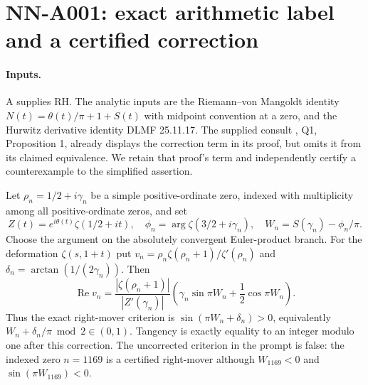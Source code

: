 \section{NN-A001: exact arithmetic label and a certified correction}
\label{sec:NN-A001}

\paragraph{Inputs.}
A supplies RH.  The analytic inputs are the Riemann--von Mangoldt identity
$N(t)=\theta(t)/\pi+1+S(t)$ with midpoint convention at a zero, and the
Hurwitz derivative identity DLMF 25.11.17.  The supplied consult
, Q1, Proposition 1, already
displays the correction term in its proof, but omits it from its claimed
equivalence.  We retain that proof's term and independently certify a
counterexample to the simplified assertion.

\begin{theorem}[NN-A001]
Let $\rho_n=1/2+i\gamma_n$ be a simple positive-ordinate zero, indexed with
multiplicity among all positive-ordinate zeros, and set
\[
 Z(t)=e^{i\theta(t)}\zeta(1/2+it),\quad
 \phi_n=\arg\zeta(3/2+i\gamma_n),\quad
 W_n=S(\gamma_n)-\phi_n/\pi.
\]
Choose the argument on the absolutely convergent Euler-product branch.
For the deformation $\zeta(s,1+t)$ put
$v_n=\rho_n\zeta(\rho_n+1)/\zeta'(\rho_n)$ and
$\delta_n=\arctan(1/(2\gamma_n))$.  Then
\[
 \operatorname{Re}v_n=
 \frac{|\zeta(\rho_n+1)|}{|Z'(\gamma_n)|}
 \left(\gamma_n\sin\pi W_n+\frac12\cos\pi W_n\right).       \tag{A001.1}
\]
Thus the exact right-mover criterion is
$\sin(\pi W_n+\delta_n)>0$, equivalently
$W_n+\delta_n/\pi\bmod2\in(0,1)$.  Tangency is exactly equality to an
integer modulo one after this correction.  The uncorrected criterion in
the prompt is false: the indexed zero $n=1169$ is a certified right-mover
although $W_{1169}<0$ and $\sin(\pi W_{1169})<0$.
\end{theorem}

